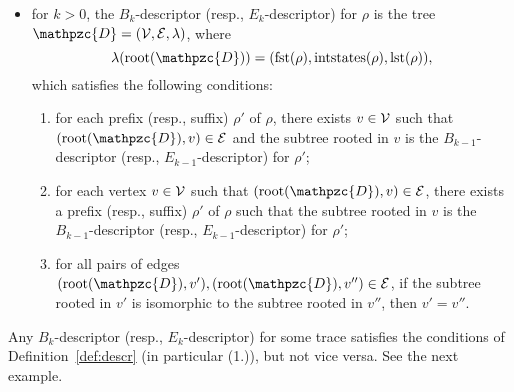 \begin{definition}
\begin{itemize}
        \item for $k>0$, the $B_k$-descriptor (resp., $E_k$-descriptor) for $\rho$ is the tree $\mathpzc{D} = (\DV,\DE,\lambda)$, where 
        \begin{equation*}
            \lambda(\Root(\mathpzc{D}))=(\fst(\rho),\intstates(\rho),\lst(\rho)),
        \end{equation*}                
        which satisfies the following conditions:
            \begin{enumerate}
                \item for each prefix (resp., suffix) $\rho'$ of $\rho$, there exists $v\in \operatorname{\mathcal{V}}$ such that $(\Root(\mathpzc{D}),v)\in \DE$ and the subtree rooted in $v$ is the $B_{k-1}$-descriptor (resp., $E_{k-1}$-descriptor) for $\rho'$;
                \item for each vertex $v\in \operatorname{\mathcal{V}}$ such that $(\Root(\mathpzc{D}),v)\in \DE$, there exists a prefix (resp., suffix) $\rho'$ of $\rho$ such that the subtree rooted in $v$ is the $B_{k-1}$-descriptor (resp., $E_{k-1}$-descriptor) for $\rho'$;
            \item for all pairs of edges $(\Root(\mathpzc{D}),v'), (\Root(\mathpzc{D}),v'')\in \DE$, if the subtree rooted in $v'$ is isomorphic to the subtree rooted in $v''$, then $v'=v''$.
            \end{enumerate}
    \end{itemize}
\end{definition}
%
Any $B_k$-descriptor (resp., $E_k$-descriptor) for some trace satisfies the 
conditions of Definition~\ref{def:descr} (in particular (1.)), but not vice 
versa. See the next example.

